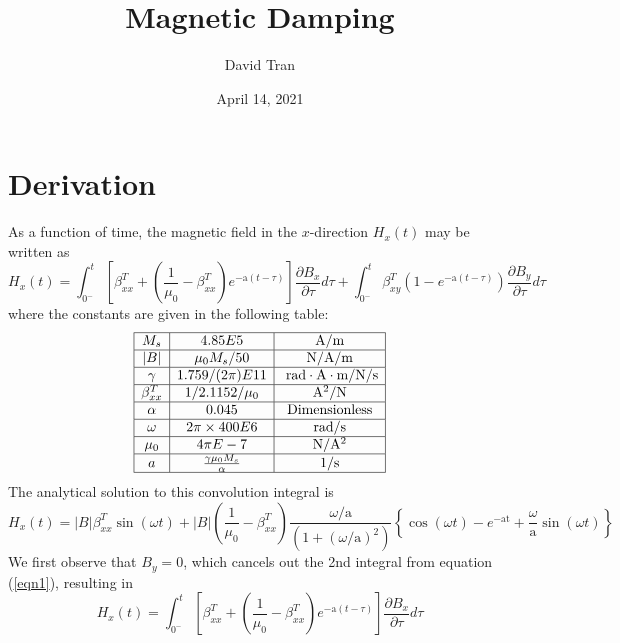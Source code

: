 \documentclass[12pt]{article}
\title{\vspace{-1.75cm}Magnetic Damping}
\author{David Tran}
\date{April 14, 2021}
\begin{document}
\maketitle
\vspace{-1.75cm}
\thispagestyle{fancy}   %

\section*{Derivation}

As a function of time, the magnetic field in the $x$-direction $H_x(t)$ may be written as
\begin{equation} \label{eqn1}
H_{x}(t)=\int_{0^{-}}^{t}\left[\beta_{x x}^{T}+\left(\frac{1}{\mu_{0}}-\beta_{x x}^{T}\right) e^{-\mathrm{a}(t-\tau)}\right] \frac{\partial B_{x}}{\partial \tau} d \tau+\int_{0^{-}}^{t} \beta_{x y}^{T}\left(1-e^{-\mathrm{a}(t-\tau)}\right) \frac{\partial B_{y}}{\partial \tau} d \tau
\end{equation}
where the constants are given in the following table:
$$
\begin{array}{|c|c|c|}
\hline M_{s} & 4.85 E 5 & \si{A} / \si{m} \\
\hline|B| & \mu_{0} M_{s} / 50 & \si{N} / \si{A} / \si{m} \\
\hline \gamma & 1.759 /(2 \pi) E 11 & \text { rad} \cdot \si{A} \cdot \si{m} / \si{N} / \si{s} \\
\hline \beta_{x x}^{T} & 1 / 2.1152 / \mu_{0} & \si{A^{2}} / \si{N} \\
\hline \alpha & 0.045 & \text { Dimensionless } \\
\hline \omega & 2 \pi \times 400 E 6 & \text { rad/s } \\
\hline \mu_0 & 4\pi E-7 &  \si{N/A^2} \\
\hline a & \frac{\gamma\mu_0M_s}{\alpha} & 1/\si{s}\\
\hline
\end{array}
$$
The analytical solution to this convolution integral is
\begin{equation} \label{eqn2}
    H_{x}(t)=|B| \beta_{x x}^{T} \sin (\omega t)+|B|\left(\frac{1}{\mu_{0}}-\beta_{x x}^{T}\right) \frac{\omega / \mathrm{a}}{\left(1+(\omega / \mathrm{a})^{2}\right)}\left\{\cos (\omega t)-e^{-\mathrm{at}}+\frac{\omega}{\mathrm{a}} \sin (\omega t)\right\}
\end{equation}
We first observe that $B_y = 0$, which cancels out the 2nd integral from equation (\ref{eqn1}), resulting in
\begin{equation} \label{eqn3}
    H_{x}(t)=\int_{0^{-}}^{t}\left[\beta_{x x}^{T}+\left(\frac{1}{\mu_{0}}-\beta_{x x}^{T}\right) e^{-\mathrm{a}(t-\tau)}\right] \frac{\partial B_{x}}{\partial \tau} d \tau
\end{equation}
\end{document}
